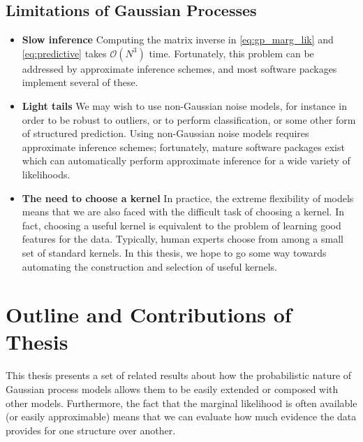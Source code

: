 \subsection{Limitations of Gaussian Processes}

\begin{itemize}

\item {\bf Slow inference}
Computing the matrix inverse in \eqref{eq:gp_marg_lik} and \eqref{eq:predictive} takes $\mathcal{O}(N^3)$ time.
Fortunately, this problem can be addressed by approximate inference schemes, and most \gp{} software packages implement several of these.

\item {\bf Light tails}
We may wish to use non-Gaussian noise models, for instance in order to be robust to outliers, or to perform classification, or some other form of structured prediction.
Using non-Gaussian noise models requires approximate inference schemes; fortunately, mature software packages exist which can automatically perform approximate inference for a wide variety of likelihoods.

\item {\bf The need to choose a kernel}
In practice, the extreme flexibility of \gp{} models means that we are also faced with the difficult task of choosing a kernel.
In fact, 
choosing a useful kernel is equivalent to the problem of learning good features for the data.
Typically, human experts choose from among a small set of standard kernels.
In this thesis, we hope to go some way towards automating the construction and selection of useful kernels.
\end{itemize}





\section{Outline and Contributions of Thesis}

This thesis presents a set of related results about how the probabilistic nature of Gaussian process models allows them to be easily extended or composed with other models.
Furthermore, the fact that the marginal likelihood is often available (or easily approximable) means that we can evaluate how much evidence the data provides for one structure over another.

